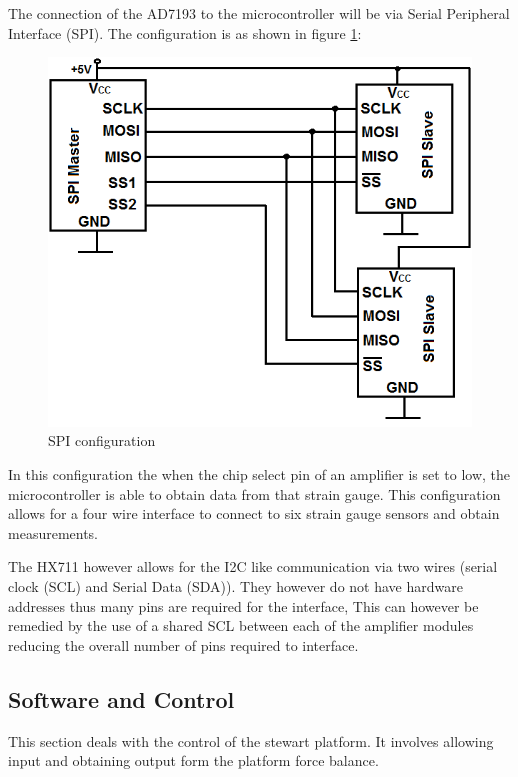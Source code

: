 The connection of the AD7193 to the microcontroller will be via Serial Peripheral Interface (SPI). The configuration is as shown in figure \ref{spi}:
\begin{center}
	\begin{figure}[H]
		\centering
		\includegraphics[width=0.55\linewidth]{Figures/SPI}
		\caption[SPI configuration]{SPI configuration}
		\label{spi}
	\end{figure}
\end{center}
In this configuration the when the chip select pin of an amplifier is set to low, the microcontroller is able to obtain data from that strain gauge. This configuration allows for a four wire interface to connect to six strain gauge sensors and obtain measurements.

The HX711 however allows for the I2C like communication via two wires (serial clock (SCL) and Serial Data (SDA)). They however do not have hardware addresses thus many pins are required for the interface, This can however be remedied by the use of a shared SCL between each of the amplifier modules reducing the overall number of pins required to interface.

\subsection{Software and Control}
This section deals with the control of the stewart platform. It involves allowing input and obtaining output form the platform force balance.
